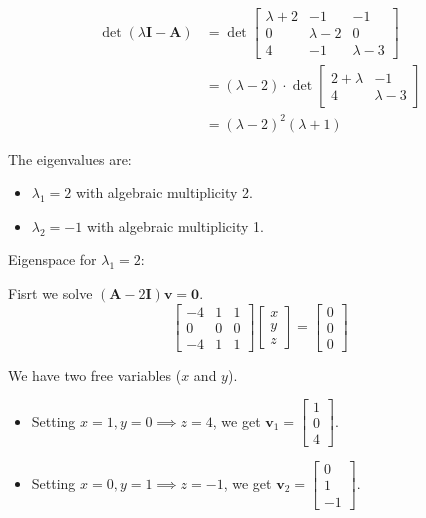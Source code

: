 \documentclass{article}
\newcommand{\0}{{\mathbf{0}}} %
\begin{document}
\begin{align*}
\det(\lambda \mathbf{I} - \mathbf{A}) &= \det
\begin{bmatrix}\lambda + 2 & -1 & -1 \\ 0 & \lambda - 2 & 0 \\ 4 & -1 & \lambda -3
\end{bmatrix}   \\
&=(\lambda-2) \cdot \det
\begin{bmatrix} 2+\lambda & -1 \\ 4 & \lambda-3
\end{bmatrix} \\
&= (\lambda - 2)^2 (\lambda + 1)
\end{align*}

The eigenvalues are:
\begin{itemize}
\item $\lambda_1 = 2$ with algebraic multiplicity 2.
\item $\lambda_2 = -1$ with algebraic multiplicity 1.
\end{itemize}

Eigenspace for $\lambda_1 = 2$:

Fisrt we solve $(\mathbf{A} - 2\mathbf{I})\mathbf{v} = \mathbf{0}$.
\[
\begin{bmatrix} -4 & 1 & 1 \\ 0 & 0 & 0 \\ -4 & 1 & 1
\end{bmatrix}
\begin{bmatrix} x \\ y \\ z
\end{bmatrix} =
\begin{bmatrix} 0 \\ 0 \\ 0
\end{bmatrix}
\]

We have two free variables ($x$ and $y$).
\begin{itemize}
\item Setting $x=1, y=0 \implies z=4$, we get $\mathbf{v}_1 =
\begin{bmatrix} 1 \\ 0 \\ 4
\end{bmatrix}$.
\item Setting $x=0, y=1 \implies z=-1$, we get $\mathbf{v}_2 =
\begin{bmatrix} 0 \\ 1 \\ -1
\end{bmatrix}$.
\end{itemize}
\end{document}
